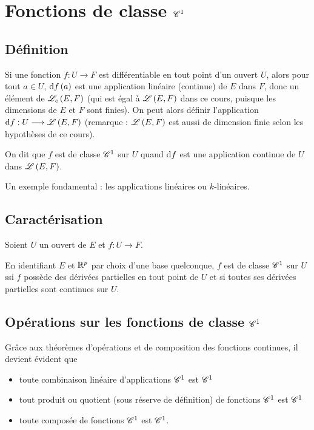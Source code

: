 \section{Fonctions de classe \(\mathscr{C}^{1}\)}

\subsection{Définition}

Si une fonction \(f:U\to F\) est différentiable en tout point d'un ouvert \(U\), alors pour tout \(a\in U\), \(\odif{f}\paren{a}\) est une application linéaire (continue) de \(E\) dans \(F\), donc un élément de \(\mathscr{L}_c\left(E,F\right)\) (qui est égal à \(\mathscr{L}\left(E,F\right)\) dans ce cours, puisque les dimensions de \(E\) et \(F\) sont finies). On peut alors définir l'application \(\odif{f}:U\to\L{E}{F}\) (remarque : \(\mathscr{L}\left(E,F\right)\) est aussi de dimension finie selon les hypothèses de ce cours).

\begin{defi}
On dit que \(f\) est de classe \(\mathscr{C}^{1}\) sur \(U\) quand \(\odif{f}\) est une application continue de \(U\) dans \(\mathscr{L}\left(E,F\right)\).
\end{defi}

Un exemple fondamental : les applications linéaires ou \(k\)-linéaires.

\subsection{Caractérisation}

\begin{theo}
Soient \(U\) un ouvert de \(E\) et \(f:U\to F\).

En identifiant \(E\) et \(\mathbb{R}^p\) par choix d'une base quelconque, \(f\) est de classe \(\mathscr{C}^{1}\) sur \(U\) ssi \(f\) possède des dérivées partielles en tout point de \(U\) et si toutes ses dérivées partielles sont continues sur \(U\).
\end{theo}

\subsection{Opérations sur les fonctions de classe \(\mathscr{C}^{1}\)}

Grâce aux théorèmes d'opérations et de composition des fonctions continues, il devient évident que

\begin{itemize}
    \item toute combinaison linéaire d'applications \(\mathscr{C}^{1}\) est \(\mathscr{C}^{1}\) \\
    \item tout produit ou quotient (sous réserve de définition) de fonctions \(\mathscr{C}^{1}\) est \(\mathscr{C}^{1}\) \\
    \item toute composée de fonctions \(\mathscr{C}^{1}\) est \(\mathscr{C}^{1}\).
\end{itemize}

